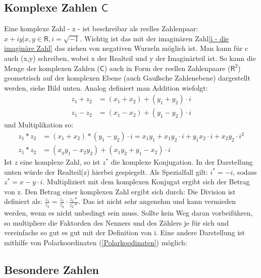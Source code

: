 \documentclass[letterpaper, titlepage]{article}
\begin{document}
\subsection{Komplexe Zahlen $\mathsf{C}$}\label{Komplexe Zahlen}
Eine komplexe Zahl - z - ist beschreibar als reelles Zahlenpaar: $x+iy|x,y \in \mathsf{R}, i = \sqrt{-1}$. Wichtig ist das mit der imaginären Zahl\ref{i - die imaginäre Zahl} das ziehen von negativen Wurzeln möglich ist. Man kann für c auch (x,y) schreiben, wobei x der Realteil und y der Imaginärteil ist. So kann die Menge der komplexen Zahlen ($\mathsf{C}$) auch in Form der reellen Zahlenpaare ($\mathsf{R}^2$) geometrisch auf der komplexen Ebene (auch Gaußsche Zahlenebene) dargestellt werden, siehe Bild unten.
\skiptwolines
Analog definiert man Addition wiefolgt: 
\\
\begin{align*}
    z_1 + z_2 &= (x_1 + x_2) + (y_1 + y_2)\cdot i \\
    z_1 - z_2 &= (x_1 - x_2) + (y_1 - y_2)\cdot i
\end{align*}
und Multiplikation so:
\\
\begin{align*}
    z_1 * z_2 &= (x_1 + x_2) * (y_1 - y_2)\cdot i = x_1 y_1 + x_1 y_2 \cdot i + y_1 x_2 \cdot i + x_2 y_2 \cdot i^2 \\
    z_1 * z_2 &= (x_y y_1 - x_2 y_2) + (x_1 y_2 + y_1 - x_2)\cdot i 
\end{align*}
\absatzformel
Ist $z$ eine komplexe Zahl, so ist $z^*$ die komplexe Konjugation. In der Darstellung unten würde der Realteil(z) hierbei gespiegelt. Als Spezialfall gilt: $i^* =-i$, sodass $z^* = x -y\cdot i$. Multipliziert mit dem komplexen Konjugat ergibt sich der Betrag von z. 
\skiptwolines
Den Betrag einer komplexen Zahl ergibt sich durch:
Die Division ist definiert als: $\frac{z_1}{z_2} = \frac{z_1}{z_2} \cdot \frac{z_2*}{z_2*}$. Das ist nicht sehr angenehm und kann vermieden werden, wenn es nicht unbedingt sein muss. Sollte kein Weg daran vorbeiführen, so multipliere die Faktorden des Nenners und des Zählers je für sich und vereinfache so gut es gut mit der Definition von i.
\skiptwolines
Eine andere Darstellung ist mithilfe von Polarkoordinaten (\ref{Polarkoodinaten}) möglich:

\subsection{Besondere Zahlen}\label{Besondere Zahlen}
\end{document}
